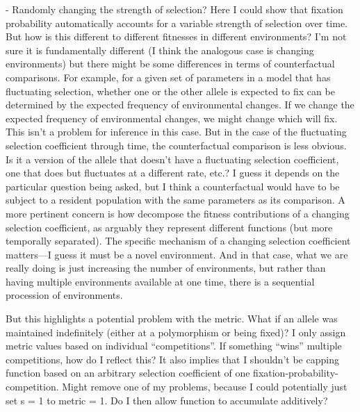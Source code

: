 \documentclass{article}
\begin{document}
- Randomly changing the strength of selection? Here I could show that fixation probability automatically accounts for a variable strength of selection over time. But how is this different to different fitnesses in different environments? I'm not sure it is fundamentally different (I think the analogous case is changing environments) but there might be some differences in terms of counterfactual comparisons. For example, for a given set of parameters in a model that has fluctuating selection, whether one or the other allele is expected to fix can be determined by the expected frequency of environmental changes. If we change the expected frequency of environmental changes, we might change which will fix. This isn't a problem for inference in this case. But in the case of the fluctuating selection coefficient through time, the counterfactual comparison is less obvious. Is it a version of the allele that doesn't have a fluctuating selection coefficient, one that does but fluctuates at a different rate, etc.? I guess it depends on the particular question being asked, but I think a counterfactual would have to be subject to a resident population with the same parameters as its comparison. A more pertinent concern is how decompose the fitness contributions of a changing selection coefficient, as arguably they represent different functions (but more temporally separated). The specific mechanism of a changing selection coefficient matters---I guess it must be a novel environment. And in that case, what we are really doing is just increasing the number of environments, but rather than having multiple environments available at one time, there is a sequential procession of environments.

But this highlights a potential problem with the metric. What if an allele was maintained indefinitely (either at a polymorphism or being fixed)? I only assign metric values based on individual ``competitions''. If something ``wins'' multiple competitions, how do I reflect this? It also implies that I shouldn't be capping function based on an arbitrary selection coefficient of one fixation-probability-competition. Might remove one of my problems, because I could potentially just set s = 1 to metric = 1. Do I then allow function to accumulate additively?
\end{document}
